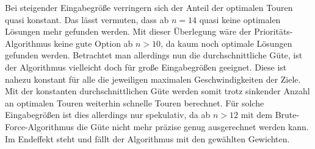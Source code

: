 \documentclass[german,version-2019-11]{uzl-thesis}
\begin{document}
Bei steigender Eingabegröße verringern sich der Anteil der optimalen Touren quasi konstant. Das lässt vermuten, dass ab $n=14$ quasi keine optimalen Lösungen mehr gefunden werden. Mit dieser Überlegung wäre der Prioritäts-Algorithmus keine gute Option ab $n>10$, da kaum noch optimale Lösungen gefunden werden. Betrachtet man allerdings nun die durchschnittliche Güte, ist der Algorithmus vielleicht doch für große Eingabegrößen geeignet. Diese ist nahezu konstant für alle die jeweiligen maximalen Geschwindigkeiten der Ziele. Mit der konstanten durchschnittlichen Güte werden somit trotz sinkender Anzahl an optimalen Touren weiterhin schnelle Touren berechnet. Für solche Eingabegrößen ist dies allerdings nur spekulativ, da ab $n>12$ mit dem Brute-Force-Algorithmus die Güte nicht mehr präzise genug ausgerechnet werden kann. Im Endeffekt steht und fällt der Algorithmus mit den gewählten Gewichten. \\~\\

\begin{table}[htpb]
\centering
{}
\caption{Güte des Prioritäts-Algorithmus}
\label{tab:ExpGüte}
\end{table}
\newpage
\end{document}
